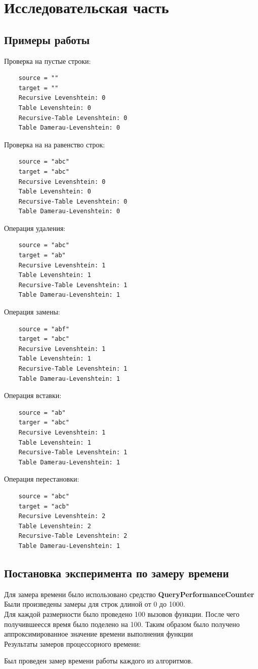 \documentclass[12pt,a4paper]{article}
\begin{document}
\section{Исследовательская часть}
\subsection{Примеры работы}
Проверка на пустые строки:
\begin{lstlisting}
	source = ""
	target = ""
	Recursive Levenshtein: 0
	Table Levenshtein: 0
	Recursive-Table Levenshtein: 0
	Table Damerau-Levenshtein: 0
\end{lstlisting}
Проверка на на равенство строк:
\begin{lstlisting}
	source = "abc"
	target = "abc"
	Recursive Levenshtein: 0
	Table Levenshtein: 0
	Recursive-Table Levenshtein: 0
	Table Damerau-Levenshtein: 0
\end{lstlisting}

Операция удаления:
\begin{lstlisting}
	source = "abc"
	target = "ab"
	Recursive Levenshtein: 1
	Table Levenshtein: 1
	Recursive-Table Levenshtein: 1
	Table Damerau-Levenshtein: 1
\end{lstlisting}

Операция замены:
\begin{lstlisting}
	source = "abf"
	target = "abc"
	Recursive Levenshtein: 1
	Table Levenshtein: 1
	Recursive-Table Levenshtein: 1
	Table Damerau-Levenshtein: 1
\end{lstlisting}

Операция вставки:
\begin{lstlisting}
	source = "ab"
	targer = "abc"
	Recursive Levenshtein: 1
	Table Levenshtein: 1
	Recursive-Table Levenshtein: 1
	Table Damerau-Levenshtein: 1
\end{lstlisting}
\clearpage
Операция перестановки:
\begin{lstlisting}
	source = "abc"
	target = "acb"
	Recursive Levenshtein: 2
	Table Levenshtein: 2
	Recursive-Table Levenshtein: 2
	Table Damerau-Levenshtein: 1
\end{lstlisting}
\subsection{Постановка эксперимента по замеру времени}
Для замера времени было использовано средство \textbf{QueryPerformanceCounter}\\
Были произведены замеры для строк длиной от 0 до 1000.\\
Для каждой размерности было проведено 100 вызовов функции. После чего получившеесся время было поделено на 100. Таким образом было получено аппроксимированное значение времени выполнения функции\\
Результаты замеров процессорного времени:\\
\begin{center}
	Был проведен замер времени работы каждого из алгоритмов.
\end{center}
\end{document}
